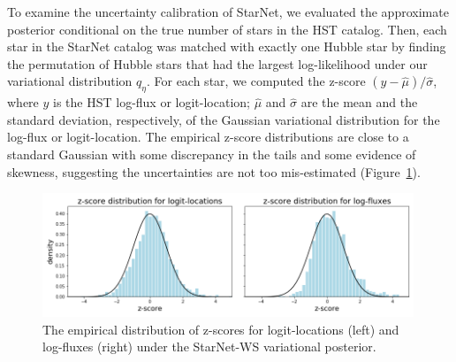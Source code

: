 
To examine the uncertainty calibration of StarNet, we evaluated the approximate posterior
conditional on the true number of stars in the HST catalog.
Then, each star in the StarNet catalog was matched with exactly one Hubble star by finding the permutation of Hubble stars that had the largest log-likelihood under our variational distribution $q_\eta$.
For each star, we computed the z-score $(y - \hat \mu) / \hat \sigma$, where $y$ is the HST log-flux or
logit-location; $\hat \mu$ and $\hat\sigma$ are the mean and the standard deviation, respectively, of the Gaussian variational distribution for the log-flux or logit-location.
The empirical z-score distributions are close to a standard Gaussian with some discrepancy in the tails and some evidence of skewness, suggesting the uncertainties are not too mis-estimated (Figure~\ref{fig:z-score_calibration}).

\begin{figure}[tb]
    \centering
    \includegraphics[width=0.99\textwidth]{figures/m2_results/zscore_calibration.png}
    \vspace{-0.5cm}
    \caption{The empirical distribution of z-scores for logit-locations (left) and log-fluxes (right) under the StarNet-WS variational posterior.
}
    \label{fig:z-score_calibration}
\end{figure}

